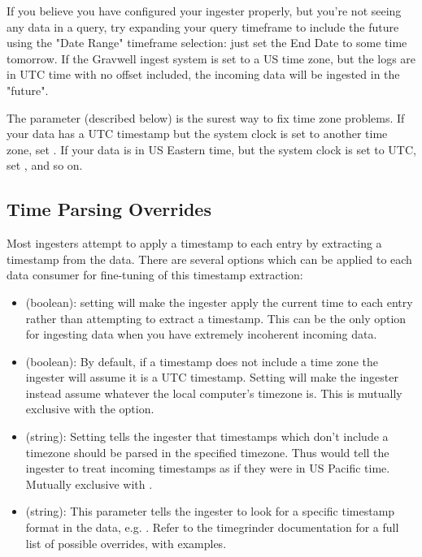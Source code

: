 If you believe you have configured your ingester properly, but you're not seeing any data in a query, try expanding your query timeframe to include the future using the "Date Range" timeframe selection: just set the End Date to some time tomorrow. If the Gravwell ingest system is set to a US time zone, but the logs are in UTC time with no offset included, the incoming data will be ingested in the "future".

The  parameter (described below) is the surest way to fix time zone problems. If your data has a UTC timestamp but the system clock is set to another time zone, set . If your data is in US Eastern time, but the system clock is set to UTC, set , and so on.

\subsection{Time Parsing Overrides}

Most ingesters attempt to apply a timestamp to each entry by extracting a timestamp from the data. There are several options which can be applied to each data consumer for fine-tuning of this timestamp extraction:

\begin{itemize}
\item
     (boolean): setting  will make the ingester apply the current time to each entry rather than attempting to extract a timestamp. This can be the only option for ingesting data when you have extremely incoherent incoming data.
\item
     (boolean): By default, if a timestamp does not include a time zone the ingester will assume it is a UTC timestamp. Setting  will make the ingester instead assume whatever the local computer's timezone is. This is mutually exclusive with the  option.
\item
     (string): Setting  tells the ingester that timestamps which don't include a timezone should be parsed in the specified timezone. Thus  would tell the ingester to treat incoming timestamps as if they were in US Pacific time. Mutually exclusive with .
\item
     (string): This parameter tells the ingester to look for a specific timestamp format in the data, e.g. . Refer to the timegrinder documentation for a full list of possible overrides, with examples.
\end{itemize}

